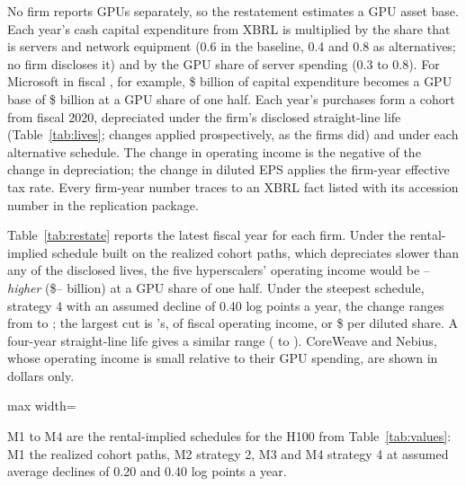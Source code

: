 No firm reports GPUs separately, so the restatement estimates a GPU asset base. Each year's cash
capital expenditure from XBRL is multiplied by the share that is servers and network equipment
(0.6 in the baseline, 0.4 and 0.8 as alternatives; no firm discloses it) and by the GPU share of
server spending (0.3 to 0.8). For Microsoft in fiscal \nAcctMsftFy, for example, \$\nAcctMsftCapexBn{}
billion of capital expenditure becomes a GPU base of \$\nAcctMsftGpuCapexBn{} billion at a GPU share
of one half. Each year's purchases form a cohort from fiscal 2020, depreciated under the firm's
disclosed straight-line life (Table~\ref{tab:lives}; changes applied prospectively, as the firms
did) and under each alternative schedule. The change in operating income is the negative of the
change in depreciation; the change in diluted EPS applies the firm-year effective tax rate.
Every firm-year number traces to an XBRL fact listed with its accession number in the replication
package.

Table~\ref{tab:restate} reports the latest fiscal year for each firm. Under the rental-implied
schedule built on the realized cohort paths, which depreciates slower than any of the disclosed
lives, the five hyperscalers' operating income would be \nAcctRealOiPctLo--\nAcctRealOiPctHi{}
\emph{higher} (\$\nAcctRealOiBnLo--\nAcctRealOiBnHi{} billion) at a GPU share of one half. Under
the steepest schedule, strategy 4 with an assumed decline of 0.40 log points a year, the change
ranges from \nAcctFourFortyOiPctLo{} to \nAcctFourFortyOiPctHi{}; the largest cut is
\nAcctFourFortyWorstFirm's, \nAcctFourFortyWorstPct{} of fiscal \nAcctFourFortyWorstFy{} operating
income, or \$\nAcctFourFortyWorstEps{} per diluted share. A four-year straight-line life gives a
similar range (\nAcctSlFourOiPctLo{} to \nAcctSlFourOiPctHi). CoreWeave and Nebius, whose operating
income is small relative to their GPU spending, are shown in dollars only.

\begin{table}[htbp]
\centering
\caption{Change in operating income and diluted EPS under alternative GPU depreciation schedules,
latest fiscal year}
\label{tab:restate}
\begin{adjustbox}{max width=\textwidth}

\end{adjustbox}
\par\smallskip\footnotesize M1 to M4 are the rental-implied schedules for the H100 from
Table~\ref{tab:values}: M1 the realized cohort paths, M2 strategy 2, M3 and M4 strategy 4 at assumed
average declines of 0.20 and 0.40 log points a year.
\end{table}

